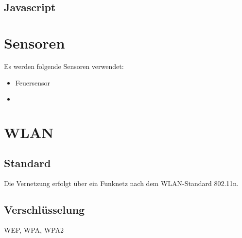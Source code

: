 \subsection{Javascript}

\section{Sensoren}

Es werden folgende Sensoren verwendet:

\begin{itemize}
\item Feuersensor
\item
\end{itemize}

\section{WLAN}
\subsection{Standard}

Die Vernetzung erfolgt über ein Funknetz nach dem WLAN-Standard 802.11n. 

\subsection{Verschlüsselung}
WEP, WPA, WPA2


